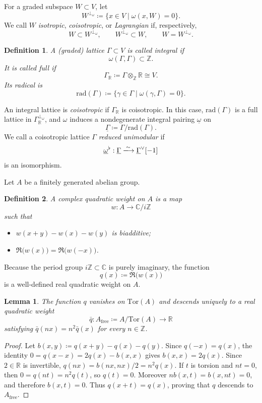 \documentclass[10pt,a4paper]{amsart}
\numberwithin{table}{section}
\numberwithin{equation}{section}
\newtheorem{defn}{Definition}[section]
\newtheorem{lem}{Lemma}[section]
\newcommand{\R}{\mathbb{R}}
\newcommand{\C}{\mathbb{C}}
\newcommand{\Z}{\mathbb{Z}}
\newcommand{\rad}{\mathrm{rad}}
\newcommand{\Tor}{\mathrm{Tor}}
\begin{document}
For a graded subspace $W\subset V$, let
\[
W^{\perp_\omega} \coloneq \{x\in V\mid \omega(x,W)=0\}.
\]
We call $W$ \emph{isotropic}, \emph{coisotropic}, or \emph{Lagrangian} if, respectively,
\[
W\subset W^{\perp_\omega},
\qquad
W^{\perp_\omega}\subset W,
\qquad
W=W^{\perp_\omega}.
\]

\begin{defn}
	A (graded) lattice $\Gamma \subset V$ is called \emph{integral} if
	\[
	\omega(\Gamma,\Gamma)\subset\Z.
	\]
	It is called \emph{full} if
	\[
	\Gamma_\R \coloneqq  \Gamma\otimes_{\Z}\R \cong V.
	\]
    Its \emph{radical} is
	\[
	\rad(\Gamma)\coloneq\{\gamma\in\Gamma\mid \omega(\gamma,\Gamma)=0\}.
	\]
\end{defn}

An integral lattice is \emph{coisotropic} if $\Gamma_\R$ is coisotropic. In this case, $\rad(\Gamma)$ is a full lattice in $\Gamma_\R^{\perp_\omega}$, and $\omega$ induces a nondegenerate integral pairing $\underline\omega$ on
\[
\underline\Gamma \coloneq \Gamma/\rad(\Gamma).
\]
We call a coisotropic lattice $\Gamma$ \emph{reduced unimodular} if
\[
\underline \omega^\flat:
\underline\Gamma\xlongrightarrow{\sim}
\underline\Gamma^\vee[-1]
\]
is an isomorphism.

Let $A$ be a finitely generated abelian group. 

\begin{defn}
A complex \emph{quadratic weight} on $A$ is a map
\[
w:A\longrightarrow\C/i\Z
\]
such that
\begin{itemize}
	\item $w(x+y)-w(x)-w(y)$ is biadditive;
	\item $\Re\bigl(w(x)\bigr)=\Re\bigl(w(-x)\bigr)$.
\end{itemize}
\end{defn}

Because the period group $i \Z \subset \C$ is purely imaginary, the function
\[
q(x)\coloneq\Re\bigl(w(x)\bigr)
\]
is a well-defined real quadratic weight on $A$.

\begin{lem}\label{lem:real-quadratic}
The function $q$ vanishes on $\Tor(A)$ and descends uniquely to a real quadratic weight
\[
\bar q:A_{\mathrm{free}}\coloneq A/\Tor(A)\longrightarrow\R
\]
satisfying $\bar q(nx)=n^2\bar q(x)$ for every $n\in\Z$.
\end{lem}

\begin{proof}
Let $b(x,y)\coloneqq q(x+y)-q(x)-q(y)$. Since $q(-x)=q(x)$, the identity $0=q(x-x)=2q(x)-b(x,x)$ gives $b(x,x)=2q(x)$. Since $2 \in \R$ is invertible, $q(nx)= b(nx,nx)/2=n^2q(x)$. If $t$ is torsion and $nt=0$, then $0=q(nt)=n^2q(t)$, so $q(t)=0$. Moreover $n b(x,t)=b(x,nt)=0$, and therefore $b(x,t)=0$. Thus $q(x+t)=q(x)$, proving that $q$ descends to $A_{\mathrm{free}}$.
\end{proof}
\end{document}
